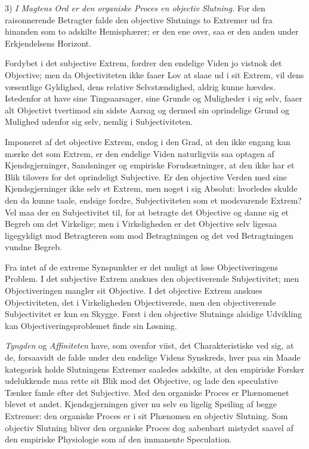 \documentclass[12pt]{book}
\newcommand{\opage}[1]{\marginnote{\footnotesize\textit{[#1]}}}
\begin{document}
3) \emph{I Magtens Ord er den organiske Proces en objectiv Slutning.} For den raisonnerende Betragter falde den objective Slutnings to Extremer ud fra hinanden som to adskilte Hemisphærer; er den ene over, saa er den anden under Erkjendelsens Horizont.

Fordybet i det subjective Extrem, fordrer den endelige Viden jo vistnok det Objective; men da Objectiviteten ikke faaer Lov at slaae ud i sit Extrem, vil dens væsentlige Gyldighed, dens relative Selvstændighed, aldrig kunne hævdes. Istedenfor at have sine Tingsaarsager, sine Grunde og Muligheder i sig selv, faaer alt Objectivt tvertimod sin sidste Aarsag og dermed sin oprindelige Grund og Mulighed udenfor sig selv, nemlig i Subjectiviteten.

Imponeret af det objective Extrem, endog i den Grad, at den ikke engang kan mærke det som Extrem, er den endelige Viden naturligviis saa optagen af Kjendsgjerninger, Sandsninger og empiriske Forudsætninger, at den ikke har et Blik tilovers for det oprindeligt Subjective. Er den objective Verden med sine Kjendsgjerninger ikke selv et Extrem, men noget i sig Absolut: hvorledes skulde den da kunne taale, endsige fordre, Subjectiviteten som et modsvarende Extrem? Vel maa der en Subjectivitet til, for at betragte det Objective og danne sig et Begreb om det Virkelige; men i Virkeligheden er det Objective selv ligesaa ligegyldigt mod Betragteren som mod Betragtningen og det ved Betragtningen vundne Begreb.

Fra intet af de extreme Synspunkter er det muligt at løse Objectiveringens Problem. I det subjective Extrem anskues den objectiverende Subjectivitet; men Objectiveringen mangler sit Objective. I det objective Extrem anskues Objectiviteten, det i Virkeligheden Objectiverede, men den objectiverende Subjectivitet er kun en Skygge. Først i den objective
\opage{421}Slutnings alsidige Udvikling kan Objectiveringsproblemet finde sin Løsning.

\emph{Tyngden} og \emph{Affiniteten} have, som ovenfor viist, det Charakteristiske ved sig, at de, forsaavidt de falde under den endelige Videns Synskreds, hver paa sin Maade kategorisk holde Slutningens Extremer saaledes adskilte, at den empiriske Forsker udelukkende maa rette sit Blik mod det Objective, og lade den speculative Tænker famle efter det Subjective. Med den organiske Proces er Phænomenet blevet et andet. Kjendsgjerningen giver nu selv en ligelig Speiling af begge Extremer: den organiske Proces er i sit Phænomen en objectiv Slutning. Som objectiv Slutning bliver den organiske Proces dog aabenbart mistydet saavel af den empiriske Physiologie som af den immanente Speculation.
\end{document}
